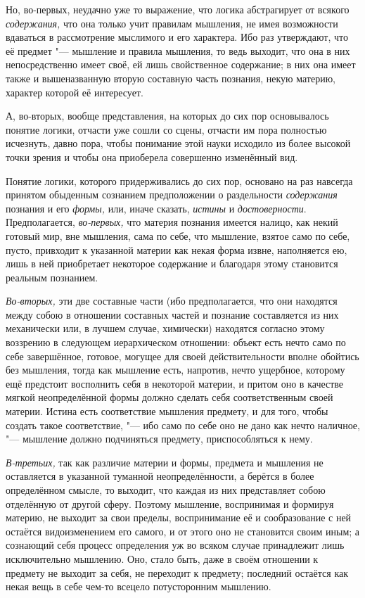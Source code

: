 Но, во-первых, неудачно уже то выражение, что логика абстрагирует от всякого
{\em содержания,} что она только учит правилам
мышления, не имея возможности вдаваться в рассмотрение мыслимого и его
характера. Ибо раз утверждают, что её предмет "--- мышление и правила
мышления, то ведь выходит, что она в них непосредственно имеет своё, ей
лишь свойственное содержание; в них она имеет также и вышеназванную вторую
составную часть познания, некую материю, характер которой её интересует.

А, во-вторых, вообще представления, на которых до сих пор
основывалось понятие логики, отчасти уже сошли со сцены, отчасти им
пора полностью исчезнуть, давно пора, чтобы понимание этой науки
исходило из более высокой точки зрения и чтобы она приоберела совершенно
изменённый вид.

Понятие логики, которого придерживались до сих пор, основано на раз навсегда
принятом обыденным сознанием предположении о раздельности {\em содержания}
познания и его {\em формы,} или, иначе сказать, {\em истины} и
{\em достоверности}. Предполагается, {\em во-первых,} что материя познания
имеется налицо, как некий готовый мир, вне мышления, сама по себе, что
мышление, взятое само по себе, пусто, привходит к указанной материи как
некая форма извне, наполняется ею, лишь в ней приобретает некоторое
содержание и благодаря этому становится реальным познанием.

{\em Во-вторых,} эти две составные части (ибо
предполагается, что они находятся между собою в отношении составных частей
и познание составляется из них механически или, в лучшем случае, химически)
находятся согласно этому воззрению в следующем иерархическом отношении:
объект есть нечто само по себе завершённое, готовое, могущее для своей
действительности вполне обойтись без мышления, тогда как мышление есть,
напротив, нечто ущербное, которому ещё предстоит восполнить себя в
некоторой материи, и притом оно в качестве мягкой неопределённой формы
должно сделать себя соответственным своей материи. Истина есть соответствие
мышления предмету, и для того, чтобы создать такое соответствие, "--- ибо само
по себе оно не дано как нечто наличное, "--- мышление должно подчиняться
предмету, приспособляться к нему.

{\em В-третьих,} так как различие материи и формы,
предмета и мышления не оставляется в указанной туманной неопределённости, а
берётся в более определённом смысле, то выходит, что каждая из них
представляет собою отделённую от другой сферу. Поэтому мышление,
воспринимая и формируя материю, не выходит за свои пределы, воспринимание
её и сообразование с ней остаётся видоизменением его самого,
и от этого оно не становится своим иным; а
сознающий себя процесс определения уж во всяком случае принадлежит лишь
исключительно мышлению. Оно, стало быть, даже в своём отношении к предмету не
выходит за себя, не переходит к предмету; последний остаётся как некая вещь в себе
чем-то всецело потусторонним мышлению.

